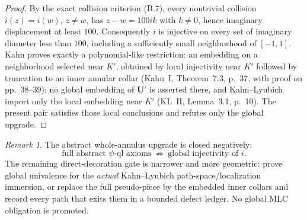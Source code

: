 \documentclass[11pt,reqno]{amsart}
\theoremstyle{definition}
\theoremstyle{remark}
\newtheorem{remark}[theorem]{Remark}
\begin{document}
\begin{proof}
By the exact collision criterion (B.7), every nontrivial collision \(i(z)=i(w)\), \(z\ne w\), has \(z-w=100ik\) with \(k\ne0\), hence imaginary displacement at least \(100\). Consequently \(i\) is injective on every set of imaginary diameter less than \(100\), including a sufficiently small neighborhood of \([-1,1]\). Kahn proves exactly a polynomial-like restriction: an embedding on a neighborhood selected near \(K'\), obtained by local injectivity near \(K'\) followed by truncation to an inner annular collar (Kahn~I, Theorem~7.3, p.~37, with proof on pp.~38--39); no global embedding of \(\mathbf U'\) is asserted there, and Kahn--Lyubich import only the local embedding near \(K'\) (KL~II, Lemma~3.1, p.~10). The present pair satisfies those local conclusions and refutes only the global upgrade.
\end{proof}
\begin{remark}\label{rem:psiql-gate}
The abstract whole-annulus upgrade is closed negatively:
\[ \boxed{\ \text{full abstract \(\psi\)-ql axioms}\ \not\Longrightarrow\ \text{global injectivity of } i.\ } \]
The remaining direct-decoration gate is narrower and more geometric: prove global univalence for the \emph{actual} Kahn--Lyubich path-space/localization immersion, or replace the full pseudo-piece by the embedded inner collars and record every path that exits them in a bounded defect ledger. No global MLC obligation is promoted.
\end{remark}
\end{document}
